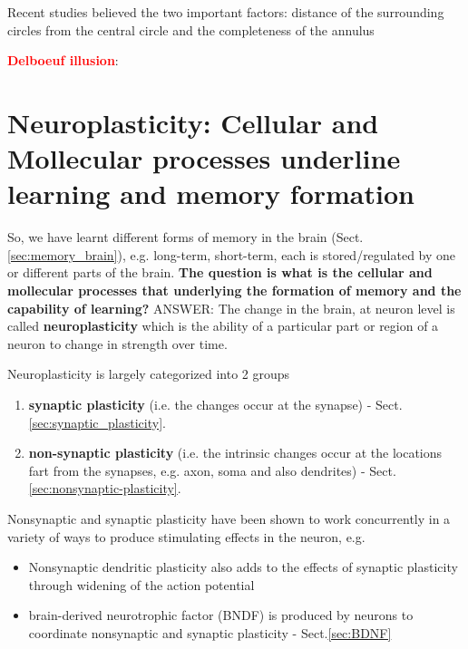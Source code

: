 Recent studies believed the two important factors: distance of the surrounding
circles from the central circle and the completeness of the annulus
 

\textcolor{red}{\bf Delboeuf illusion}:




\chapter{Neuroplasticity: Cellular and Mollecular processes underline learning
and memory formation}
\label{sec:source-synaptic-plasticity}

So, we have learnt different forms of memory in the brain
(Sect.\ref{sec:memory_brain}), e.g. long-term, short-term, each is
stored/regulated by one or different parts of the brain.
{\bf The question is what is the cellular and mollecular processes that
underlying the formation of memory and the capability of learning?} ANSWER: The
change in the brain, at neuron level is called {\bf neuroplasticity} which is
the ability of a particular part or region of a neuron to change in strength
over time.

Neuroplasticity is largely categorized into 2 groups
\begin{enumerate}
  \item {\bf synaptic plasticity} (i.e. the changes occur at the synapse) -
  Sect.\ref{sec:synaptic_plasticity}.
  
  
  \item {\bf non-synaptic plasticity} (i.e. the intrinsic changes occur at the
  locations fart from the synapses, e.g. axon, soma and also dendrites)
  - Sect.\ref{sec:nonsynaptic-plasticity}.
 
 
\end{enumerate}

Nonsynaptic and synaptic plasticity have been shown to work concurrently in a
variety of ways to produce stimulating effects in the neuron, e.g.
\begin{itemize}
  \item  Nonsynaptic dendritic plasticity also adds to the effects of synaptic
  plasticity through widening of the action potential
  
  \item brain-derived neurotrophic factor (BNDF) is produced by neurons to
  coordinate nonsynaptic and synaptic plasticity - Sect.\ref{sec:BDNF}
\end{itemize}


